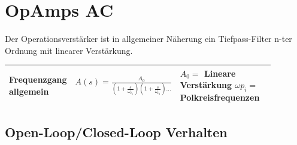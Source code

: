 \newpage
\section{OpAmps AC}

Der Operationsverstärker ist in allgemeiner Näherung ein Tiefpass-Filter n-ter Ordnung mit linearer Verstärkung.

 \begin{tabular}{|p{0.15\linewidth}|p{0.28\linewidth}|p{0.445\linewidth}|}
 	\hline
 	Frequenzgang allgemein
 		& \large{$A(s) = \frac{A_{0}}{(1+\frac{s}{\omega_{p_1}})(1+\frac{s}{\omega_{p_2}})\dots}$}
 		& $A_{0}=$ Lineare Verstärkung \newline $\omega{p_i}=$ Polkreisfrequenzen \\
 	\hline
 \end{tabular}
 
\subsection{Open-Loop/Closed-Loop Verhalten}

